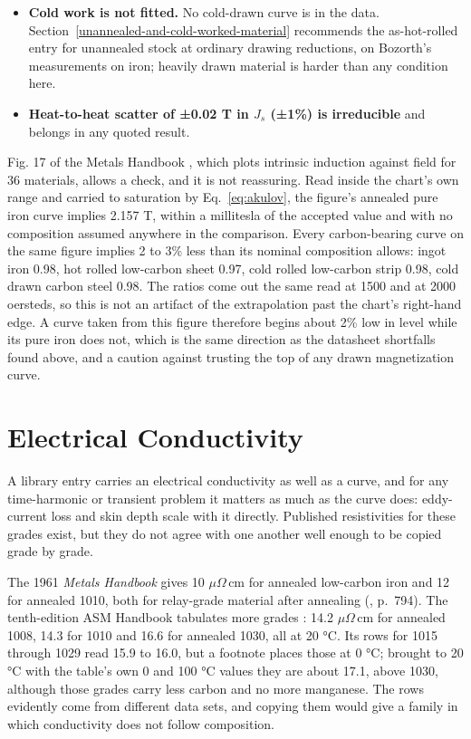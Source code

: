 \documentclass[
  11pt,
]{article}
\begin{document}
\begin{itemize}
\item \textbf{Cold work is not fitted.} No cold-drawn curve is in the data. Section~\ref{unannealed-and-cold-worked-material} recommends the as-hot-rolled entry for unannealed stock at ordinary drawing reductions, on Bozorth's measurements on iron; heavily drawn material is harder than any condition here.
\item \textbf{Heat-to-heat scatter of ±0.02 T in \(J_s\) (±1\%) is irreducible} and belongs in any quoted result.
\end{itemize}

Fig. 17 of the Metals Handbook \cite{metalshandbook1966}, which plots intrinsic induction against field for 36 materials, allows a check, and it is not reassuring. Read inside the chart's own range and carried to saturation by Eq.~\eqref{eq:akulov}, the figure's annealed pure iron curve implies 2.157 T, within a millitesla of the accepted value and with no composition assumed anywhere in the comparison. Every carbon-bearing curve on the same figure implies 2 to 3\% less than its nominal composition allows: ingot iron 0.98, hot rolled low-carbon sheet 0.97, cold rolled low-carbon strip 0.98, cold drawn carbon steel 0.98. The ratios come out the same read at 1500 and at 2000 oersteds, so this is not an artifact of the extrapolation past the chart's right-hand edge. A curve taken from this figure therefore begins about 2\% low in level while its pure iron does not, which is the same direction as the datasheet shortfalls found above, and a caution against trusting the top of any drawn magnetization curve.

\section{Electrical Conductivity}\label{electrical-conductivity}

A library entry carries an electrical conductivity as well as a curve, and for any time-harmonic or transient problem it matters as much as the curve does: eddy-current loss and skin depth scale with it directly. Published resistivities for these grades exist, but they do not agree with one another well enough to be copied grade by grade.

The 1961 \emph{Metals Handbook} gives 10 \(\mu\Omega\)\,cm for annealed low-carbon iron and 12 for annealed 1010, both for relay-grade material after annealing (\cite{metalshandbook1966}, p.~794). The tenth-edition ASM Handbook tabulates more grades \cite{asm1990}: 14.2 \(\mu\Omega\)\,cm for annealed 1008, 14.3 for 1010 and 16.6 for annealed 1030, all at 20 °C. Its rows for 1015 through 1029 read 15.9 to 16.0, but a footnote places those at 0 °C; brought to 20 °C with the table's own 0 and 100 °C values they are about 17.1, above 1030, although those grades carry less carbon and no more manganese. The rows evidently come from different data sets, and copying them would give a family in which conductivity does not follow composition.
\end{document}
